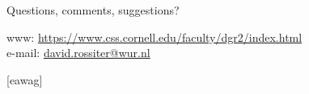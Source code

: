 \documentclass[aspectratio=169]{beamer}
\begin{document}


{  %
\begin{frame} 
\frametitle{}
\framesubtitle{}

 \begin{center}
 \vspace{0.5cm}
 \textcolor{isric_yellow}{\Large{Questions, comments, suggestions?}}
 \end{center}
\textcolor{isric_yellow}{www: \url{https://www.css.cornell.edu/faculty/dgr2/index.html}}
\\ 
\textcolor{isric_yellow}{e-mail: \url{david.rossiter@wur.nl}}
\end{frame} 
}


[eawag] %
\end{document}
